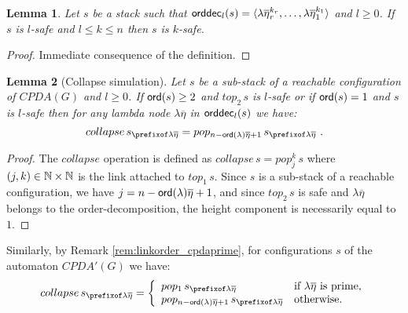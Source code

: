 \documentclass[a4paper,draft]{article}
\newtheorem{lemma}{Lemma}[section]
\theoremstyle{remark}
\theoremstyle{definition}
\newcommand\orddec{{\sf orddec}}
\begin{document}
\begin{lemma}
\label{lem:stacksafety_immediate results}
Let $s$ be a stack such that $\orddec_l(s) = \langle \lambda \overline\eta_r^{k_r}, \ldots, \lambda \overline{\eta}_1^{k_1} \rangle$ and $l\geq 0$.
If $s$ is $l$-safe and $l \leq k \leq n$ then $s$ is $k$-safe.
\end{lemma}
\begin{proof}
Immediate consequence of the definition.
\end{proof}

\begin{lemma}[Collapse simulation]
\label{lem:safecollapsesimulation}
Let $s$ be a sub-stack of a reachable configuration of $CPDA(G)$ and $l\geq 0$.
If ${\sf ord}(s) \geq 2$ and $top_2\,s$ is $l$-safe or if ${\sf ord}(s) = 1$ and $s$ is $l$-safe then for any lambda node $\lambda\overline\eta$ in $\orddec_l(s)$ we have:
$$collapse\,s_{\prefixof\lambda\overline\eta} = pop_{n-\ord \lambda\overline\eta +1}\,s_{\prefixof\lambda\overline\eta} \ . $$
\end{lemma}
\begin{proof}
The $collapse$ operation is defined as  $collapse\,s = pop_j^k\,s$ where $(j,k)\in\mathbb{N}\times\mathbb{N}$ is the link attached to $top_1\,s$.
Since $s$ is a sub-stack of a reachable configuration, we have $j = n-{\sf ord}(\lambda)\overline\eta +1$, and since
$top_2\,s$ is safe and $\lambda\overline\eta$ belongs to the order-decomposition, the height component is necessarily equal to $1$.
\end{proof}
Similarly, by Remark \ref{rem:linkorder_cpdaprime}, for configurations $s$ of the automaton $CPDA'(G)$ we have:
$$collapse\,s_{\prefixof\lambda\overline\eta} = 
\left\{
\begin{array}{ll}
pop_1\,s_{\prefixof\lambda\overline\eta} & \mbox{if $\lambda\overline\eta$ is prime,}\\
pop_{n-\ord \lambda\overline\eta +1}\,s_{\prefixof\lambda\overline\eta} & \mbox{otherwise.}
\end{array}
\right.
$$
\end{document}
